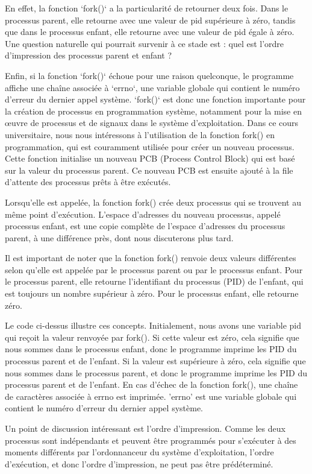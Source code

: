 \documentclass[12pt]{article}
\begin{document}
En effet, la fonction `fork()` a la particularité de retourner deux fois. Dans le processus parent, elle retourne avec une valeur de pid supérieure à zéro, tandis que dans le processus enfant, elle retourne avec une valeur de pid égale à zéro. Une question naturelle qui pourrait survenir à ce stade est : quel est l'ordre d'impression des processus parent et enfant ? 

Enfin, si la fonction `fork()` échoue pour une raison quelconque, le programme affiche une chaîne associée à `errno`, une variable globale qui contient le numéro d'erreur du dernier appel système. `fork()` est donc une fonction importante pour la création de processus en programmation système, notamment pour la mise en œuvre de processus et de signaux dans le système d'exploitation.
Dans ce cours universitaire, nous nous intéressons à l'utilisation de la fonction fork() en programmation, qui est couramment utilisée pour créer un nouveau processus. Cette fonction initialise un nouveau PCB (Process Control Block) qui est basé sur la valeur du processus parent. Ce nouveau PCB est ensuite ajouté à la file d'attente des processus prêts à être exécutés.

Lorsqu'elle est appelée, la fonction fork() crée deux processus qui se trouvent au même point d'exécution. L'espace d'adresses du nouveau processus, appelé processus enfant, est une copie complète de l'espace d'adresses du processus parent, à une différence près, dont nous discuterons plus tard.

Il est important de noter que la fonction fork() renvoie deux valeurs différentes selon qu'elle est appelée par le processus parent ou par le processus enfant. Pour le processus parent, elle retourne l'identifiant du processus (PID) de l'enfant, qui est toujours un nombre supérieur à zéro. Pour le processus enfant, elle retourne zéro.

Le code ci-dessus illustre ces concepts. Initialement, nous avons une variable pid qui reçoit la valeur renvoyée par fork(). Si cette valeur est zéro, cela signifie que nous sommes dans le processus enfant, donc le programme imprime les PID du processus parent et de l'enfant. Si la valeur est supérieure à zéro, cela signifie que nous sommes dans le processus parent, et donc le programme imprime les PID du processus parent et de l'enfant. En cas d'échec de la fonction fork(), une chaîne de caractères associée à errno est imprimée. 'errno' est une variable globale qui contient le numéro d'erreur du dernier appel système.

Un point de discussion intéressant est l'ordre d'impression. Comme les deux processus sont indépendants et peuvent être programmés pour s'exécuter à des moments différents par l'ordonnanceur du système d'exploitation, l'ordre d'exécution, et donc l'ordre d'impression, ne peut pas être prédéterminé.
\end{document}
